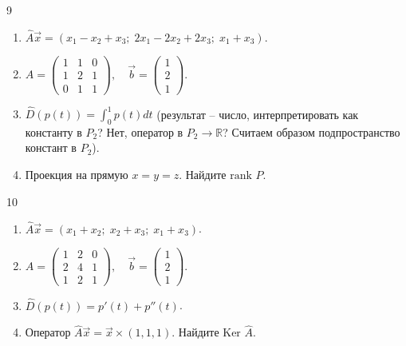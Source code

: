 \documentclass[12pt,a4paper]{article}
\theoremstyle{plain}
\theoremstyle{definition}
\begin{document}
\begin{taskbox}{9}
    \begin{enumerate}
        \item $\hat{A}\vec{x} = (x_1 - x_2 + x_3; \; 2x_1 - 2x_2 + 2x_3; \; x_1 + x_3)$.
        \item $A = \begin{pmatrix} 1 & 1 & 0 \\ 1 & 2 & 1 \\ 0 & 1 & 1 \end{pmatrix}, \quad \vec{b} = \begin{pmatrix} 1 \\ 2 \\ 1 \end{pmatrix}$.
        \item $\hat{D}(p(t)) = \int_0^1 p(t) dt$ (результат -- число, интерпретировать как константу в $P_2$? Нет, оператор в $P_2 \to \mathbb{R}$? Считаем образом подпространство констант в $P_2$).
        \item Проекция на прямую $x=y=z$. Найдите $\text{rank } \hat{P}$.
    \end{enumerate}
\end{taskbox}

\begin{taskbox}{10}
    \begin{enumerate}
        \item $\hat{A}\vec{x} = (x_1 + x_2; \; x_2 + x_3; \; x_1 + x_3)$.
        \item $A = \begin{pmatrix} 1 & 2 & 0 \\ 2 & 4 & 1 \\ 1 & 2 & 1 \end{pmatrix}, \quad \vec{b} = \begin{pmatrix} 1 \\ 2 \\ 1 \end{pmatrix}$.
        \item $\hat{D}(p(t)) = p'(t) + p''(t)$.
        \item Оператор $\hat{A}\vec{x} = \vec{x} \times (1,1,1)$. Найдите $\text{Ker } \hat{A}$.
    \end{enumerate}
\end{taskbox}
\end{document}
